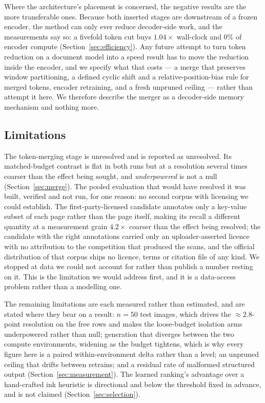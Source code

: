 \documentclass[conference]{IEEEtran}
\begin{document}
Where the architecture's placement is concerned, the negative results are the more
transferable ones. Because both inserted stages are downstream of a frozen encoder, the
method can only ever reduce decoder-side work, and the measurements say so: a fivefold token
cut buys $1.04\times$ wall-clock and $0\%$ of encoder compute
(Section~\ref{sec:efficiency}). Any future attempt to turn token reduction on a document
model into a speed result has to move the reduction inside the encoder, and we specify what
that costs --- a merge that preserves window partitioning, a defined cyclic shift and a
relative-position-bias rule for merged tokens, encoder retraining, and a fresh unpruned
ceiling --- rather than attempt it here. We therefore describe the merger as a decoder-side
memory mechanism and nothing more.

\subsection{Limitations}

The token-merging stage is unresolved and is reported as unresolved. Its matched-budget
contrast is flat in both runs but at a resolution several times coarser than the effect being
sought, and \emph{underpowered} is not a null (Section~\ref{sec:merge}). The pooled
evaluation that would have resolved it was built, verified and not run, for one reason: no
second corpus with licensing we could establish. The first-party-licensed candidate annotates
only a key-value subset of each page rather than the page itself, making its recall a
different quantity at a measurement grain $4.2\times$ coarser than the effect being resolved;
the candidate with the right annotations carried only an uploader-asserted licence with no
attribution to the competition that produced the scans, and the official distribution of that
corpus ships no licence, terms or citation file of any kind. We stopped at data we could not
account for rather than publish a number resting on it. This is the limitation we would
address first, and it is a data-access problem rather than a modelling one.

The remaining limitations are each measured rather than estimated, and are stated where they
bear on a result: $n = 50$ test images, which drives the $\approx 2.8$-point resolution on
the free rows and makes the loose-budget isolation arms underpowered rather than null;
generation that diverges between the two compute environments, widening as the budget
tightens, which is why every figure here is a paired within-environment delta rather than a
level; an unpruned ceiling that drifts between retrains; and a residual rate of malformed
structured output (Section~\ref{sec:measurement}). The learned ranking's advantage over a
hand-crafted ink heuristic is directional and below the threshold fixed in advance, and is
not claimed (Section~\ref{sec:selection}).
\end{document}
